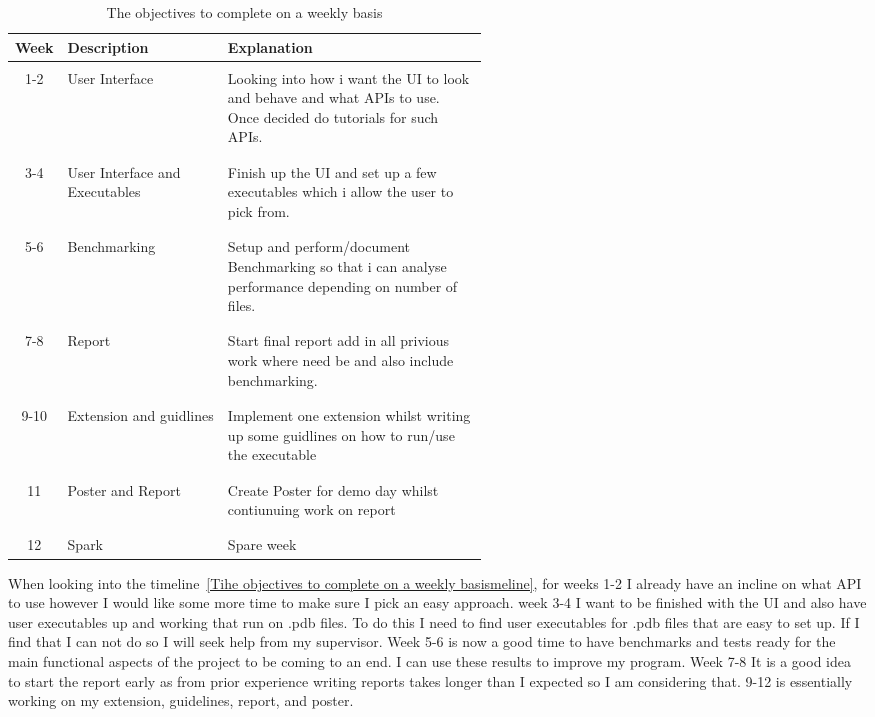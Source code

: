 \documentclass{report}
\begin{document}
\begin{table}[h!]
    \begin{center}
    \label{tab:Timeline}
        \begin{tabular}{c|l|p{0.55\linewidth}}
        Week & Description & Explanation\\
        \hline
        \\
        1-2 & User Interface & Looking into how i want the UI to look and behave and what APIs to use. Once decided do tutorials for such APIs.\\
        \\
        \hline
        \\
        3-4 & User Interface and Executables & Finish up the UI and set up a few executables which i allow the user to pick from.\\
        \\
        \hline
        \\
        5-6 & Benchmarking & Setup and perform/document Benchmarking so that i can analyse performance depending on number of files.\\
        \\
        \hline
        \\
        7-8 & Report & Start final report add in all privious work where need be and also include benchmarking.\\
        \\
        \hline
        \\
        9-10 & Extension and guidlines & Implement one extension whilst writing up some guidlines on how to run/use the executable\\
        \\
        \hline
        \\
        11 & Poster and Report & Create Poster for demo day whilst contiunuing work on report\\
        \\
        \hline
        \\
        12 & Spark & Spare week\\
        \end{tabular}
        \caption{\label{Timeline}The objectives to complete on a weekly basis}
    \end{center}
\end{table}

When looking into the timeline~\ref{Tihe objectives to complete on a weekly basismeline}, for weeks 1-2 I already have an incline on what API to use however I would like some more time to make sure I pick an easy approach. week 3-4 I want to be finished with the UI and also have user executables up and working that run on .pdb files. To do this I need to find user executables for .pdb files that are easy to set up. If I find that I can not do so I will seek help from my supervisor. Week 5-6 is now a good time to have benchmarks and tests ready for the main functional aspects of the project to be coming to an end. I can use these results to improve my program. Week 7-8 It is a good idea to start the report early as from prior experience writing reports takes longer than I expected so I am considering that. 9-12 is essentially working on my extension, guidelines, report, and poster.
\end{document}
